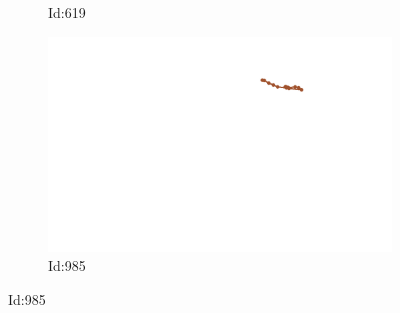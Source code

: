 \documentclass[12pt,twoside]{report}
\begin{document}
\begin{figure}
\begin{subfigure}[b]{0.20\textwidth}
\caption{Id:619}
\end{subfigure}
\begin{subfigure}[b]{0.20\textwidth}
\centering
\includegraphics[width=\textwidth]{../../trajectories/985.png}
\caption{Id:985}
\end{subfigure}
\end{figure}
\end{document}
